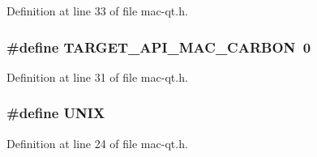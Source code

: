 Definition at line 33 of file mac-\/qt.\+h.

\hypertarget{mac-qt_8h_a8601b9b36b5d7d40e6d42c0e04dd936c}{
\subsubsection[{T\+A\+R\+G\+E\+T\+\_\+\+A\+P\+I\+\_\+\+M\+A\+C\+\_\+\+C\+A\+R\+B\+O\+N}]{\setlength{\rightskip}{0pt plus 5cm}\#define T\+A\+R\+G\+E\+T\+\_\+\+A\+P\+I\+\_\+\+M\+A\+C\+\_\+\+C\+A\+R\+B\+O\+N~0}}\label{mac-qt_8h_a8601b9b36b5d7d40e6d42c0e04dd936c}


Definition at line 31 of file mac-\/qt.\+h.

\hypertarget{mac-qt_8h_a2dafe4a81445873e5c3cb0dff7741429}{
\subsubsection[{U\+N\+I\+X}]{\setlength{\rightskip}{0pt plus 5cm}\#define U\+N\+I\+X}}\label{mac-qt_8h_a2dafe4a81445873e5c3cb0dff7741429}


Definition at line 24 of file mac-\/qt.\+h.

